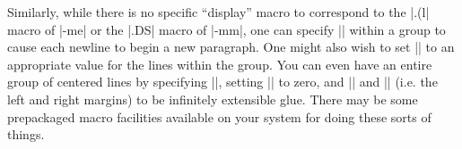 Similarly, while there is no specific ``display'' macro
to correspond to the |.(l| macro of |-me| or
the |.DS| macro of |-mm|, one
can specify |\obeylines| within a group
to cause each newline to begin a new
paragraph.  One might also wish to set |\parindent|
to an appropriate value for the lines within the group.  You
can even have an entire group of centered lines by specifying |\obeylines|,
setting |\parindent| to zero, and |\leftskip| and |\rightskip|
(i.e. the left and right margins) to
be infinitely extensible glue.  There
may be some prepackaged
macro facilities available on your system for doing these sorts of
things.
